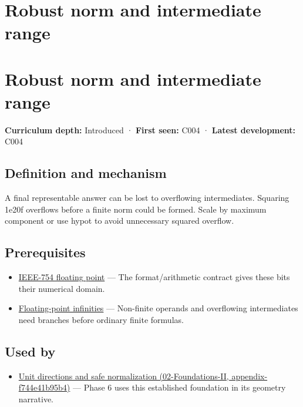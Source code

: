 \hypertarget{appendix-7f1e17dcafb1}{}
\section*{Robust norm and intermediate range}
\section{Robust norm and intermediate range}\label{robust-norm-and-intermediate-range}

\textbf{Curriculum depth:} Introduced · \textbf{First seen:} C004 · \textbf{Latest development:} C004

\subsection{Definition and mechanism}\label{definition-and-mechanism}

A final representable answer can be lost to overflowing intermediates. Squaring 1e20f overflows before a finite norm could be formed. Scale by maximum component or use hypot to avoid unnecessary squared overflow.

\subsection{Prerequisites}\label{prerequisites}

\begin{itemize}
\tightlist
\item
  \hyperref[appendix-343615f49ddf]{IEEE-754 floating point} --- The format/arithmetic contract gives these bits their numerical domain.
\item
  \hyperref[appendix-eb336149c00a]{Floating-point infinities} --- Non-finite operands and overflowing intermediates need branches before ordinary finite formulas.
\end{itemize}

\subsection{Used by}\label{used-by}

\begin{itemize}
\tightlist
\item
  \href{}{Unit directions and safe normalization (02-Foundations-II, appendix-f744e41b95b4)} --- Phase 6 uses this established foundation in its geometry narrative.
\end{itemize}

